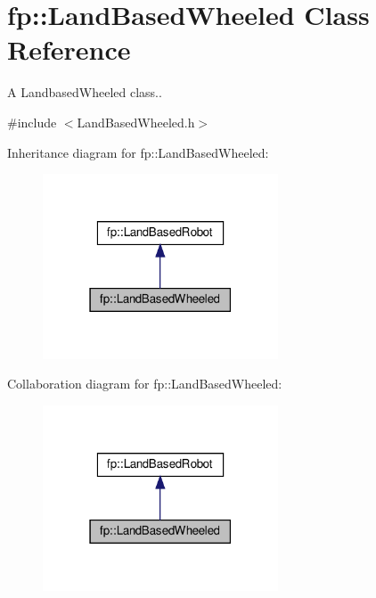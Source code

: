 \hypertarget{classfp_1_1_land_based_wheeled}{}\section{fp\+:\+:Land\+Based\+Wheeled Class Reference}
\label{classfp_1_1_land_based_wheeled}


A Landbased\+Wheeled class..  




{\ttfamily \#include $<$Land\+Based\+Wheeled.\+h$>$}



Inheritance diagram for fp\+:\+:Land\+Based\+Wheeled\+:
\nopagebreak
\begin{figure}[H]
\begin{center}
\leavevmode
\includegraphics[width=198pt]{classfp_1_1_land_based_wheeled__inherit__graph}
\end{center}
\end{figure}


Collaboration diagram for fp\+:\+:Land\+Based\+Wheeled\+:
\nopagebreak
\begin{figure}[H]
\begin{center}
\leavevmode
\includegraphics[width=198pt]{classfp_1_1_land_based_wheeled__coll__graph}
\end{center}
\end{figure}
